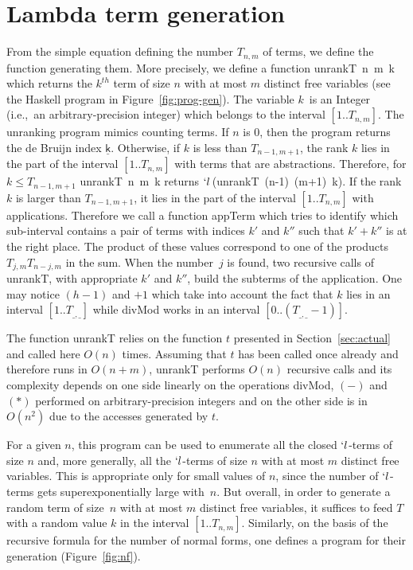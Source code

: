 \documentclass{jfp1}
\newcommand{\ie}{i.e.,~}
\newcommand{\Var}[1]{\underline{\mathsf{#1}}}
\begin{document}
\section{Lambda term generation}
\label{sec:lambda-term-gener}

From the simple equation defining the number $T_{n,m}$ of terms, we define the
function generating them.  More precisely, we define a function \textsf{unrankT~n~m~k}
which returns the $k^{th}$ term of size $n$ with at most $m$ distinct free variables
(see the \textsf{Haskell} program in Figure~\ref{fig:prog-gen}).  The variable $k$~is
an \textsf{Integer} (\ie an arbitrary-precision integer) which belongs to the interval $[1
.. T_{n,m}]$.  The unranking program mimics counting terms. If $n$ is $0$, then the
program returns the de Bruijn index $\Var{k}$.  Otherwise, if $k$ is less than
$T_{n-1,m+1}$, the rank $k$ lies in the part of the interval $[1 .. T_{n,m}]$ with
terms that are abstractions. Therefore, for $k\le T_{n-1,m+1}$ \textsf{unrankT~n~m~k}
returns $`l\,$\textsf{(unrankT~(n-1)~(m+1)~k)}. If the rank $k$ is larger than
$T_{n-1,m+1}$, it lies in the part of the interval $[1 .. T_{n,m}]$ with
applications.  Therefore we call a function \textsf{appTerm} which tries to identify which
sub-interval contains a pair of terms with indices $k'$ and $k''$ such that $k'+ k''$
is at the right place. The product of these values correspond to one of the products
$T_{j,m}T_{n-j,m}$ in the sum.  When the number~$j$ is found, two recursive calls of
\textsf{unrankT}, with appropriate $k'$ and $k''$, build the subterms of the application.  One
may notice $(h-1)$ and $+1$ which take into account the fact that $k$ lies in an
interval $[1..T_{\_,\_}]$ while \textsf{divMod} works in an interval
$[0..(T_{\_,\_}-1)]$.

The function \textsf{unrankT} relies on the function $t$ presented in
Section~\ref{sec:actual} and called here $O(n)$ times.  Assuming that $t$ has been
called once already and therefore runs in $O(n+m)$, \textsf{unrankT} performs $O(n)$
recursive calls and its complexity depends on one side linearly on the operations
\textsf{divMod}, $(-)$ and $(*)$ performed on arbitrary-precision integers and on the other side is in
$O(n^2)$ due to the accesses generated by $t$.

For a given $n$, this program can be used to enumerate all the closed $`l$-terms of size $n$ and, more
generally, all the $`l$-terms of size $n$ with at most $m$ distinct free variables.
This is appropriate only for small values of $n$, since the number of $`l$-terms gets superexponentially 
large with~$n$.  But overall, in order to generate a random term of size~$n$ with at most $m$
distinct free variables, it suffices to feed $T$ with a random value $k$ in the
interval $[1..T_{n,m}]$.  Similarly, on the basis of the recursive formula for the
number of normal forms, one defines a program for their generation (Figure~\ref{fig:nf}).
\end{document}
